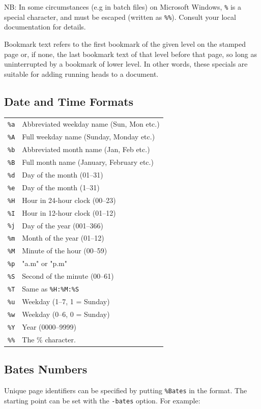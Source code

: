 \documentclass{book}
\begin{document}
  NB: In some circumstances (e.g in batch files) on Microsoft Windows, \verb!%! is a special character, and must be escaped (written as \verb$%%$). Consult your local documentation for details.

Bookmark text refers to the first bookmark of the given level on the stamped page or, if none, the last bookmark text of that level before that page, so long as uninterrupted by a bookmark of lower level. In other words, these specials are suitable for adding running heads to a document.

  \subsection{Date and Time Formats}
  \begin{tabular}{ll}
    \texttt{\%a} & Abbreviated weekday name (Sun, Mon etc.)\\
    \texttt{\%A} & Full weekday name (Sunday, Monday etc.)\\
    \texttt{\%b} & Abbreviated month name (Jan, Feb etc.)\\
    \texttt{\%B} & Full month name (January, February etc.)\\
    \texttt{\%d} & Day of the month (01--31) \\
    \texttt{\%e} & Day of the month (1--31) \\
    \texttt{\%H} & Hour in 24-hour clock (00--23)\\
    \texttt{\%I} & Hour in 12-hour clock (01--12)\\
    \texttt{\%j} & Day of the year (001--366)\\
    \texttt{\%m} & Month of the year (01--12)\\
    \texttt{\%M} & Minute of the hour (00--59)\\
    \texttt{\%p} & "a.m" or "p.m"\\
    \texttt{\%S} & Second of the minute (00--61)\\
    \texttt{\%T} & Same as \texttt{\%H:\%M:\%S}\\
    \texttt{\%u} & Weekday (1--7, 1 = Sunday)\\
    \texttt{\%w} & Weekday (0--6, 0 = Sunday)\\
    \texttt{\%Y} & Year (0000--9999)\\
    \texttt{\%\%} & The \% character.
  \end{tabular}

  \subsection{Bates Numbers}
  Unique page identifiers can be specified by putting \verb!%Bates! in the format.
The starting point can be set with the \texttt{-bates} option. For example:
\end{document}
